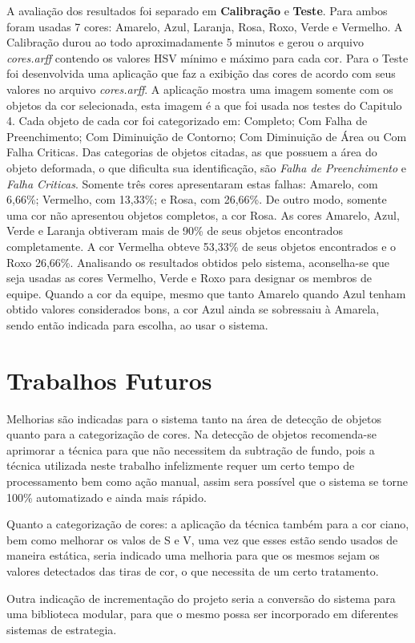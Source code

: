 A avaliação dos resultados foi separado em \textbf{Calibração} e \textbf{Teste}. Para ambos foram usadas 7 cores: Amarelo, Azul, Laranja, Rosa, Roxo, Verde e Vermelho. A Calibração durou ao todo aproximadamente 5 minutos e gerou o arquivo \textit{cores.arff} contendo os valores HSV mínimo e máximo para cada cor. Para o Teste foi desenvolvida uma aplicação que faz a exibição das cores de acordo com seus valores no arquivo \textit{cores.arff}. A aplicação mostra uma imagem somente com os objetos da cor selecionada, esta imagem é a que foi usada nos testes do Capitulo 4. Cada objeto de cada cor foi categorizado em: Completo; Com Falha de Preenchimento; Com Diminuição de Contorno; Com Diminuição de Área ou Com Falha Criticas. Das categorias de objetos citadas, as que possuem a área do objeto deformada, o que dificulta sua identificação, são \textit{Falha de Preenchimento} e \textit{Falha Criticas}. Somente tr\^{e}s cores apresentaram estas falhas: Amarelo, com 6,66\%; Vermelho, com 13,33\%; e Rosa, com 26,66\%. De outro modo, somente uma cor não apresentou objetos completos, a cor Rosa. As cores Amarelo, Azul, Verde e Laranja obtiveram mais de 90\% de seus objetos encontrados completamente. A cor Vermelha obteve 53,33\% de seus objetos encontrados e o Roxo 26,66\%. 
Analisando os resultados obtidos pelo sistema, aconselha-se que seja usadas as cores Vermelho, Verde e Roxo para designar os membros de equipe. Quando a cor da equipe, mesmo que tanto Amarelo quando Azul tenham obtido valores considerados bons, a cor Azul ainda se sobressaiu à Amarela, sendo então indicada para escolha, ao usar o sistema. 

\section{Trabalhos Futuros}
Melhorias são indicadas para o sistema tanto na área de detecção de objetos quanto para a categorização de cores. Na detecção de objetos recomenda-se aprimorar a técnica para que não necessitem da subtração de fundo, pois a técnica utilizada neste trabalho infelizmente requer um certo tempo de processamento bem como ação manual, assim sera possível que o sistema se torne 100\% automatizado e ainda mais rápido.

 Quanto a categorização de cores: a aplicação da técnica também para a cor ciano, bem como melhorar os valos de S e V, uma vez que esses estão sendo usados de maneira estática, seria indicado uma melhoria para que os mesmos sejam os valores detectados das tiras de cor, o que necessita de um certo tratamento.
 
Outra indicação de incrementação do projeto seria a conversão do sistema para uma biblioteca modular, para que o mesmo possa ser incorporado em diferentes sistemas de estrategia. 